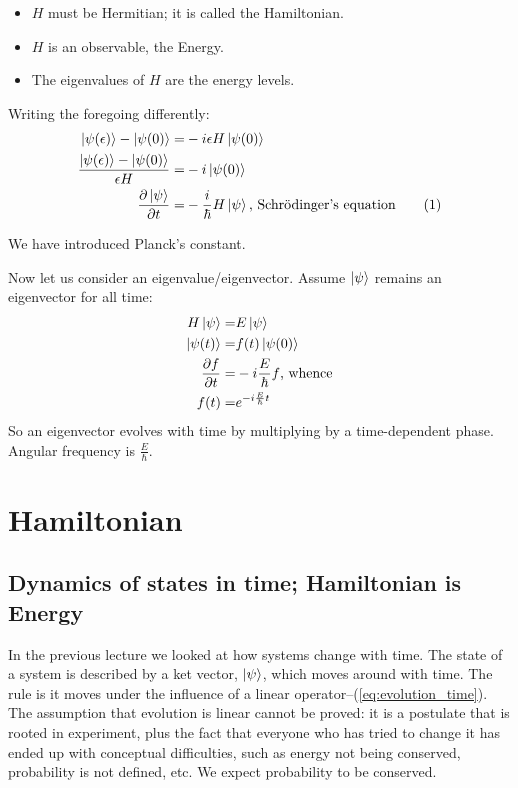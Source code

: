 \documentclass[]{article}
\newcommand\numberthis{\addtocounter{equation}{1}\tag{\theequation}}
\begin{document}
\begin{itemize}
	\item $H$ must be Hermitian; it is called the Hamiltonian.
	\item $H$ is an observable, the Energy.
	\item The eigenvalues of $H$ are the energy levels.
\end{itemize}
Writing the foregoing differently:
\begin{align*}
	\ket{\psi(\epsilon)} - \ket{\psi(0)} =& -i \epsilon H \ket{\psi(0)}\\
	\frac{\ket{\psi(\epsilon)} - \ket{\psi(0)}}{\epsilon H } =& -i \ket{\psi(0)}\\
	\frac{\partial \ket{\psi}}{\partial t} =& -\frac{i}{\hbar}  H \ket{\psi} \text{, Schr\"odinger's equation} \numberthis \label{eq:schroedinger}
\end{align*}

We have introduced Planck's constant.

Now let us consider an eigenvalue/eigenvector. Assume $\ket{\psi}$ remains an eigenvector for all time:
\begin{align*}
	H \ket{\psi} =& E \ket{\psi} \\
	\ket{\psi(t)} =& f(t) \ket{\psi(0)}\\
	\frac{\partial f}{\partial t} =&-i \frac{E}{\hbar}f\text{, whence}\\
	f(t) =& e^{-i \frac{E}{\hbar} t}
\end{align*}
So an eigenvector evolves with time by multiplying by a time-dependent phase. Angular frequency is $\frac{E}{\hbar}$.


\section{Hamiltonian}

\subsection{Dynamics of states in time; Hamiltonian is Energy}
In the previous lecture we looked at how systems change with time. The state of a system is described by a ket vector, $\ket{\psi}$, which moves around with time. The rule is it moves under the influence of a linear operator--(\ref{eq:evolution_time}). The assumption that evolution is linear cannot be proved: it is a postulate that is rooted in experiment, plus the fact that everyone who has tried to change it has ended up with conceptual difficulties, such as energy not being conserved, probability is not defined, etc. We expect probability to be conserved.
\end{document}
